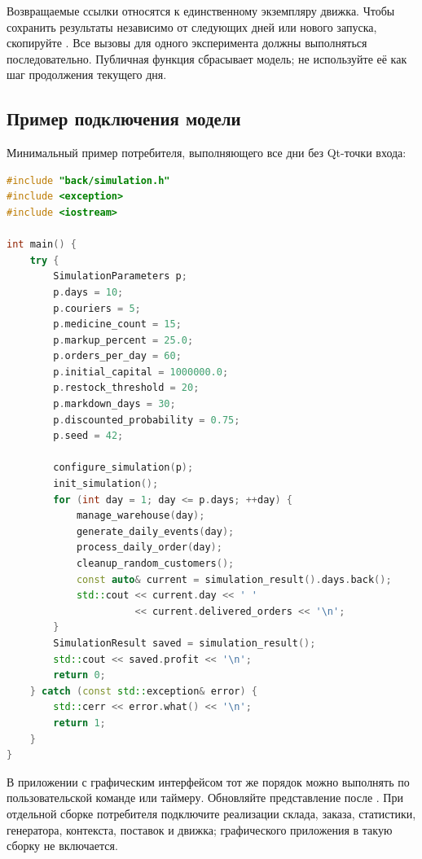 Возвращаемые ссылки относятся к единственному экземпляру движка.
Чтобы сохранить результаты независимо от следующих дней или нового запуска,
скопируйте . Все вызовы для одного эксперимента должны
выполняться последовательно. Публичная функция 
сбрасывает модель; не используйте её как шаг продолжения текущего дня.

\subsection{Пример подключения модели}
Минимальный пример потребителя, выполняющего все дни без Qt-точки входа:
\begin{lstlisting}[language=C++]
#include "back/simulation.h"
#include <exception>
#include <iostream>

int main() {
    try {
        SimulationParameters p;
        p.days = 10;
        p.couriers = 5;
        p.medicine_count = 15;
        p.markup_percent = 25.0;
        p.orders_per_day = 60;
        p.initial_capital = 1000000.0;
        p.restock_threshold = 20;
        p.markdown_days = 30;
        p.discounted_probability = 0.75;
        p.seed = 42;

        configure_simulation(p);
        init_simulation();
        for (int day = 1; day <= p.days; ++day) {
            manage_warehouse(day);
            generate_daily_events(day);
            process_daily_order(day);
            cleanup_random_customers();
            const auto& current = simulation_result().days.back();
            std::cout << current.day << ' '
                      << current.delivered_orders << '\n';
        }
        SimulationResult saved = simulation_result();
        std::cout << saved.profit << '\n';
        return 0;
    } catch (const std::exception& error) {
        std::cerr << error.what() << '\n';
        return 1;
    }
}
\end{lstlisting}
В приложении с графическим интерфейсом тот же порядок можно выполнять
по пользовательской команде или таймеру. Обновляйте представление после
. При отдельной сборке потребителя подключите
реализации склада, заказа, статистики, генератора, контекста, поставок и движка;
 графического приложения в такую сборку не включается.


